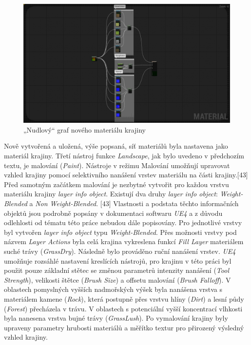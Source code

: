 \documentclass[a4paper, 12pt]{report}
\begin{document}
\begin{figure}[h!]
	\centering
	\includegraphics[width=16cm]{Landscape_Material.jpg}
	\caption{„Nudlový“ graf nového materiálu krajiny}
\end{figure}

Nově vytvořená a uložená, výše popsaná, síť materiálů byla nastavena jako materiál krajiny. Třetí nástroj funkce \textit{Landscape}, jak bylo uvedeno v předchozím textu, je malování (\textit{Paint}). Nástroje v režimu Malování umožňují upravovat vzhled krajiny pomocí selektivního nanášení vrstev materiálu na části krajiny.[43] Před samotným začátkem malování je nezbytné vytvořit pro každou vrstvu materiálu krajiny \textit{layer info object}. Existují dva druhy \textit{layer info object}: \textit{Weight-Blended} a \textit{Non Weight-Blended}. [43] Vlastnosti a podstata těchto informačních objektů jsou podrobně popsány v dokumentaci softwaru \textit{UE4} a z důvodu odlehlosti od tématu této práce nebudou dále popisovány. Pro jednotlivé vrstvy byl vytvořen \textit{layer info object} typu \textit{Weight-Blended}. Přes možnosti vrstvy pod názvem \textit{Layer Actions} byla celá krajina vykreslena funkcí \textit{Fill Layer} materiálem suché trávy (\textit{GrassDry}). Následně bylo prováděno ruční nanášení vrstev. \textit{UE4} umožňuje rozsáhlé nastavení kreslících nástrojů, pro krajinu v této práci byl použit pouze základní stětec se změnou parametrů intenzity nanášení (\textit{Tool Strength}), velikosti štětce (\textit{Brush Size}) a offsetu malování (\textit{Brush Falloff}). V oblastech pomyslných vyšších nadmořských výšek byla nanášena vrstva s materiálem kamene (\textit{Rock}), která postupně přes vrstvu hlíny (\textit{Dirt}) a lesní půdy (\textit{Forest}) přecházela v trávu. V oblastech s potenciální vyšší koncentrací vlhkosti byla nanesena vrstva bujné trávy (\textit{GrassLush}). Po vymalování krajiny byly upraveny parametry hrubosti materiálů a měřítko textur pro přirozený výsledný vzhled krajiny.
\end{document}

